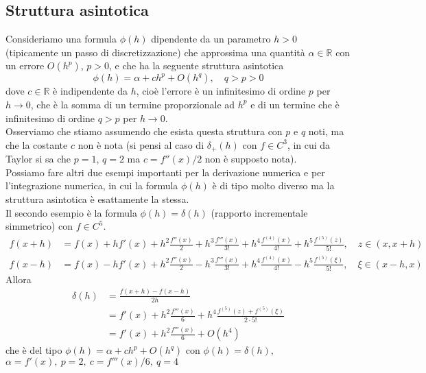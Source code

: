 \documentclass[12pt,a4paper]{article}
\begin{document}
\subsection{Struttura asintotica}
Consideriamo una formula $\phi (h)$ dipendente da un parametro $h>0$ (tipicamente un passo di discretizzazione) che approssima una quantità $\alpha \in \mathbb{R}$ con un errore $O(h^p)$, $p>0$, e che ha la seguente struttura asintotica
\[
\phi (h) = \alpha + ch^p + O(h^q), \quad q>p>0
\]
dove $c \in \mathbb{R}$ è indipendente da $h$, cioè l'errore è un infinitesimo di ordine $p$ per $h \to 0$,
che è la somma di un termine proporzionale ad $h^p$ e di un termine che è infinitesimo di ordine $q>p$ per $h \to 0$.\\
Osserviamo che stiamo assumendo che esista questa struttura con $p$ e $q$ noti, ma che la costante $c$ non è nota (si pensi al caso di $\delta_+ (h)$ con $f \in C^3$, in cui da Taylor si sa che $p=1$, $q=2$ ma $c = f''(x)/2$ non è supposto nota).\\
Possiamo fare altri due esempi
importanti per la derivazione numerica e per l'integrazione numerica, in cui la formula $\phi (h)$ è di tipo molto diverso ma la struttura asintotica è esattamente la stessa.\\
Il secondo esempio è la formula $\phi (h) = \delta (h)$ (rapporto incrementale simmetrico) con $f \in C^5$.\\
\[
\begin{split}
f(x+h) & = f(x) + hf'(x) + h^2 \frac{f''(x)}{2} + h^3 \frac{f'''(x)}{3!} + h^4 \frac{f^{(4)}(x)}{4!} + h^5 \frac{f^{(5)} (z)}{5!}, \quad z \in (x, x+h) \\
f(x-h) & = f(x) - hf'(x) + h^2 \frac{f''(x)}{2} - h^3 \frac{f'''(x)}{3!} + h^4 \frac{f^{(4)} (x)}{4!} - h^5 \frac{f^{(5)} (\xi)}{5!}, \quad \xi \in (x-h, x)
\end{split}
\]
Allora
\begin{align*}
    \delta (h) & = \frac{f(x+h) - f(x-h)}{2h} \\
    & = f'(x) + h^2 \frac{f'''(x)}{6} + h^4 \frac{f^{(5)} (z) + f^{(5)} (\xi)}{2 \cdot 5!} \\
    &= f'(x) + h^2 \frac{f'''(x)}{6} + O(h^4)
\end{align*}
che è del tipo $\phi (h) = \alpha + ch^p + O(h^q)$ con $\phi (h) = \delta (h)$, $\alpha = f'(x), \  p=2, \ c=f'''(x)/6, \ q=4$\\\\
\end{document}
